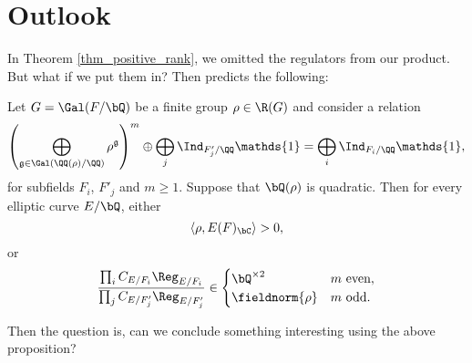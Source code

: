 \section{Outlook}

In Theorem \ref{thm_positive_rank}, we omitted the regulators from our product. But what if we put them in? Then \cite[Some result]{DEW1}
predicts the following:

\begin{prop}
    Let $G = \Gal(F / \bQ)$ be a finite group $\rho \in \R(G)$ and consider a relation
    \[ \left(\bigoplus_{\mathfrak{g}\in\Gal(\QQ(\rho)/\QQ)}\rho^{\mathfrak{g}}\right)^m\oplus\bigoplus_j\Ind_{F'_j/\QQ}\mathds{1}=\bigoplus_i\Ind_{F_i/\QQ}\mathds{1}, \]
    for subfields $F_i$, $F'_j$ and $m \geq 1$. 
    Suppose that $\bQ(\rho)$ is quadratic. Then for every elliptic curve $E / \bQ$, either 
    \[ \langle \rho, E(F)_{\bC} \rangle  > 0, \]
    or
    \[ \frac{\prod_i C_{E / F_i} \Reg_{E / F_i}}{\prod_j C_{E / F_j'} \Reg_{E / F_j'}} \in
    \begin{cases}
        \bQ^{\times 2} & m \text{ even}, \\
        \fieldnorm{\rho} & m \text{ odd}.
    \end{cases}
    \]
\end{prop} 
Then the question is, can we conclude something interesting using the above proposition?
